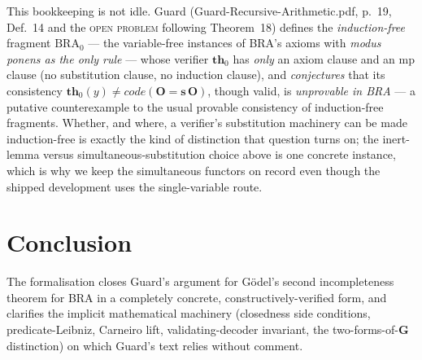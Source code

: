 \documentclass[11pt]{article}
\theoremstyle{plain}
\theoremstyle{definition}
\theoremstyle{remark}
\newcommand{\code}[1]{\mathit{code}(#1)}
\begin{document}
This bookkeeping is not idle.  Guard (Guard-Recursive-Arithmetic.pdf, p.~19, Def.~14 and the
\textsc{open problem} following Theorem~18) defines the \emph{induction-free}
fragment $\mathrm{BRA}_0$ --- the variable-free instances of BRA's axioms
with \emph{modus ponens as the only rule} --- whose verifier $\mathbf{th}_0$
has \emph{only} an axiom clause and an mp clause (no substitution clause, no
induction clause), and \emph{conjectures} that its consistency
$\mathbf{th}_0(y) \neq \code{\mathbf{O}=\mathbf{s}\,\mathbf{O}}$, though
valid, is \emph{unprovable in BRA} --- a putative counterexample to the usual
provable consistency of induction-free fragments.  Whether, and where, a
verifier's substitution machinery can be made induction-free is exactly the
kind of distinction that question turns on; the inert-lemma versus
simultaneous-substitution choice above is one concrete instance, which is why
we keep the simultaneous functors on record even though the shipped
development uses the single-variable route.

\section{Conclusion}

The formalisation closes Guard's argument for G\"odel's second
incompleteness theorem for BRA in a completely concrete,
constructively-verified form, and clarifies the implicit mathematical
machinery (closedness side conditions, predicate-Leibniz, Carneiro lift,
validating-decoder invariant, the two-forms-of-$\mathbf{G}$ distinction) on
which Guard's text relies without comment.

\end{document}
